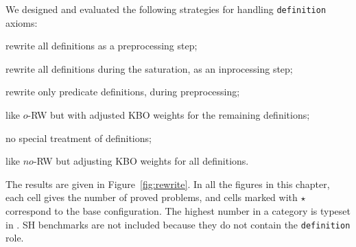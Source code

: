 

We designed and evaluated the following strategies for handling
\texttt{definition} axioms:

\begin{description}[labelwidth=\widthof{\rm no-RW$+$KBO~}]
  \item[\rm pre-RW~] rewrite all definitions as a preprocessing step;
  \item[\rm in-RW~] rewrite all definitions during the saturation, as an inprocessing step;
  \item[\rm $o$-RW~] rewrite only predicate definitions, during preprocessing;
  \item[\rm $o$-RW$+$KBO~] like $o$-RW but with adjusted KBO weights for the remaining
    definitions;
  \item[\rm no-RW~] no special treatment of definitions;
  \item[\rm no-RW$+$KBO~] like $no$-RW but adjusting KBO weights for all definitions.
\end{description}

The results are given in Figure~\ref{fig:rewrite}. In all the figures in this chapter, each
cell gives the number of proved problems, and cells marked with $\star$
correspond to the base configuration. The highest number in a category is typeset in
. SH benchmarks are not
included because they do not contain the \texttt{definition} role.

